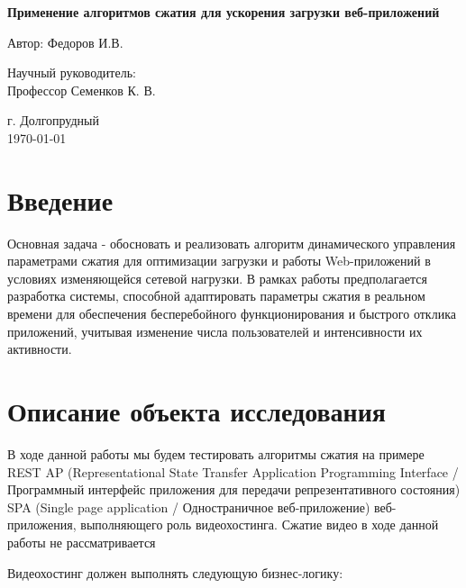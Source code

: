 \documentclass[12pt]{article}
\begin{document}
\begin{titlepage}
    \centering
    \vspace*{2cm}

    {\LARGE\bfseries Применение алгоритмов сжатия для ускорения загрузки веб-приложений\par}
    \vspace{1cm}

    {\large Автор: Федоров И.В.\par}
    \vspace{1.5cm}

    {\large Научный руководитель: \\ Профессор Семенков К. В.\par}
    \vspace{2cm}

    {\large г. Долгопрудный \\ \today\par}

\end{titlepage}

\tableofcontents

\newpage

\section{Введение}
Основная задача - обосновать и реализовать алгоритм динамического управления параметрами сжатия для оптимизации загрузки и работы Web-приложений в условиях изменяющейся сетевой нагрузки.
В рамках работы предполагается разработка системы, способной адаптировать параметры сжатия в реальном времени для обеспечения бесперебойного функционирования и быстрого отклика приложений,
учитывая изменение числа пользователей и интенсивности их активности.

\section{Описание объекта исследования}

В ходе данной работы мы будем тестировать алгоритмы сжатия на примере REST AP
(Representational State Transfer Application Programming Interface / Программный интерфейс приложения для передачи репрезентативного состояния)
SPA (Single page application / Одностраничное веб-приложение) веб-приложения, выполняющего роль видеохостинга.
Сжатие видео в ходе данной работы не рассматривается

Видеохостинг должен выполнять следующую бизнес-логику:
\end{document}
